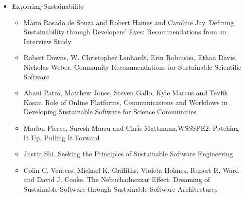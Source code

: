 \documentclass[11pt, oneside]{amsart}
\begin{document}
\begin{itemize}
\item Exploring Sustainability
\begin{itemize}
\item Mario {Rosado de Souza} and Robert Haines and Caroline Jay. Defining Sustainability through Developers' Eyes: Recommendations from an Interview Study~\cite{wssspe2_rosada_de_souza}
\item Robert Downs, W. Christopher Lenhardt, Erin Robinson, Ethan Davis, Nicholas Weber. Community Recommendations for Sustainable Scientific Software~\cite{wssspe2_downs}
\item Abani Patra, Matthew Jones, Steven Gallo, Kyle Marcus and Tevfik Kosar. Role of Online Platforms, Communications and Workflows in Developing Sustainable Software for Science Communities~\cite{wssspe2_patra}
\item Marlon Pierce, Suresh Marru and Chris Mattmann.{WSSSPE2}: Patching It Up, Pulling It Forward~\cite{wssspe2_pierce}
\item Justin Shi. Seeking the Principles of Sustainable Software Engineering~\cite{wssspe2_shi}
\item Colin C. Venters, Michael K. Griffiths, Violeta Holmes, Rupert R. Ward and David J. Cooke. The Nebuchadnezzar Effect: Dreaming of Sustainable Software through Sustainable Software Architectures~\cite{wssspe2_venters}
\end{itemize}


\end{itemize}
\end{document}
